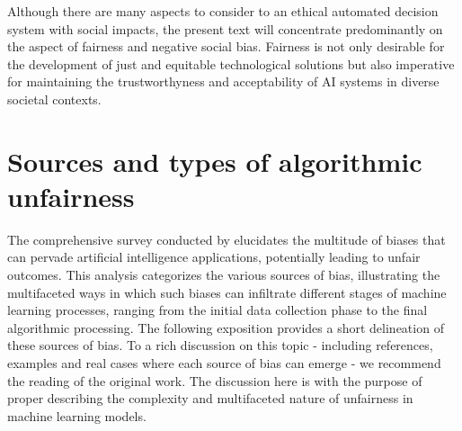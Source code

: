 Although there are many aspects to consider to an ethical automated decision system with social impacts, the present text will concentrate predominantly on the aspect of fairness and negative social bias. Fairness is not only desirable for the development of just and equitable technological solutions but also imperative for maintaining the trustworthyness and acceptability of AI systems in diverse societal contexts.

\section{Sources and types of algorithmic unfairness}

The comprehensive survey conducted by \citet{Mehrabi2019} elucidates the multitude of biases that can pervade artificial intelligence applications, potentially leading to unfair outcomes. This analysis categorizes the various sources of bias, illustrating the multifaceted ways in which such biases can infiltrate different stages of machine learning processes, ranging from the initial data collection phase to the final algorithmic processing. The following exposition provides a short delineation of these sources of bias. To a rich discussion on this topic - including references, examples and real cases where each source of bias can emerge - we recommend the reading of the original work. The discussion here is with the purpose of proper describing the complexity and multifaceted nature of unfairness in machine learning models.


